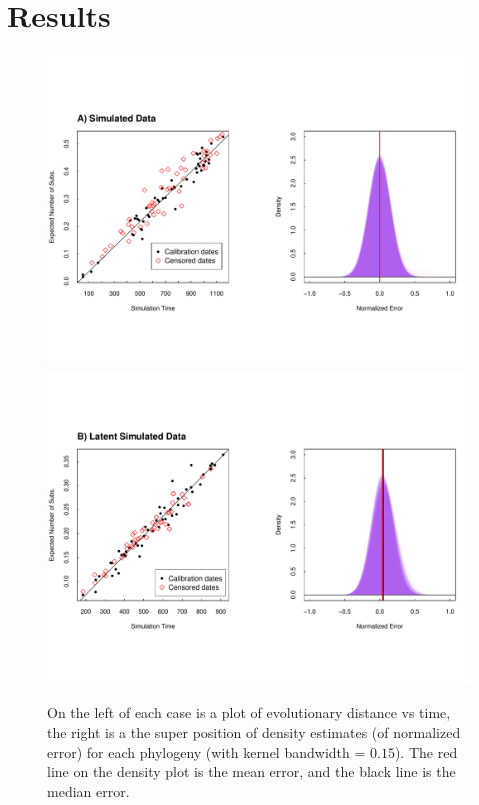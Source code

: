 \section * {Results} \label{sec:results}

\begin{figure} \label{fig:results1}
	\centering
	\includegraphics[trim=0cm 0cm 0cm 6cm, clip=true, scale=0.425]{figures/simulated.pdf} \\
	\includegraphics[trim=0cm 0cm 0cm 7cm, clip=true,scale=0.425]{figures/simulated_latent.pdf}\\
	\caption[Simulated Data]{On the left of each case is a plot of evolutionary distance vs time, the right is a the super position of density estimates (of normalized error) for each phylogeny (with kernel bandwidth = $0.15$). The red line on the density plot is the mean error, and the black line is the median error. }
\end{figure}

